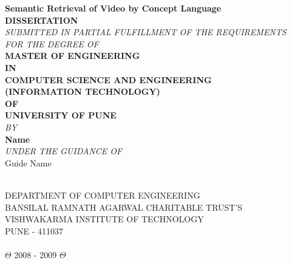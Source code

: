 \vspace{0.4in}
\begin{center}
{\Large \bf Semantic Retrieval of Video by Concept Language
}\\
\vspace{0.3in}
{\bf DISSERTATION} \\ 
\vspace{0.2in}
{\it SUBMITTED IN PARTIAL FULFILLMENT OF THE REQUIREMENTS}\\
{\it FOR THE DEGREE OF}\\ 
\vspace{0.2in}
{\bf MASTER OF ENGINEERING}\\
\vspace{0.2in}
{\bf IN}\\
\vspace{0.2in}
{\bf COMPUTER SCIENCE AND ENGINEERING\\
(INFORMATION TECHNOLOGY)}\\
{\bf OF }\\
{\bf UNIVERSITY OF PUNE}\\
\vspace{0.2in}
{\it BY}\\
\vspace{0.1in}
{\bf Name}\\
\vspace{0.3in}
{\it UNDER THE GUIDANCE OF}\\
\vspace{0.1in}
{\large Guide Name}\\ \ \\
\vspace{0.1in}

{\large DEPARTMENT OF COMPUTER ENGINEERING}\\
{\normalsize BANSILAL RAMNATH AGARWAL CHARITABLE TRUST'S}\\
{\large VISHWAKARMA INSTITUTE OF TECHNOLOGY}\\
{\large PUNE - 411037} \\ \ \\



$\Theta$ 2008 - 2009 $\Theta$

\end{center}

